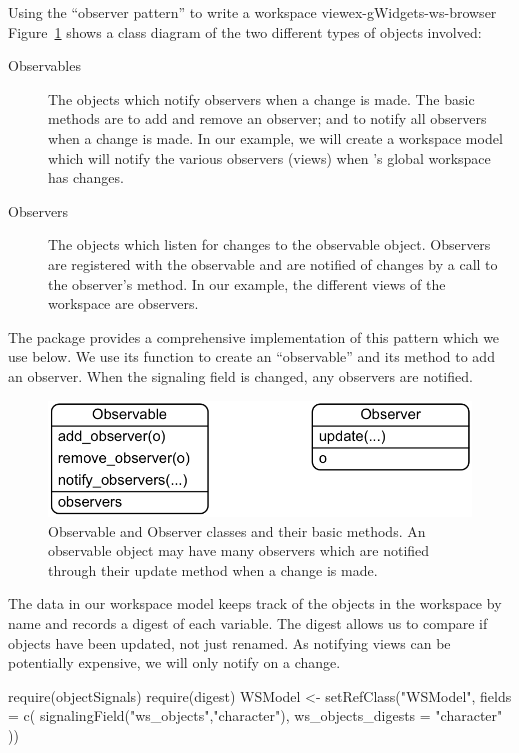 \begin{example}{Using the ``observer pattern'' to write a workspace view}{ex-gWidgets-ws-browser}
Figure~\ref{fig:observer-observable} shows a class diagram of the two
different types of objects involved:


\begin{description}
\item[Observables] The objects which notify observers when a change is
  made. The basic methods are to add and remove an observer; and to
  notify all observers when a change is made. In our example, we will
  create a workspace model which will notify the various observers
  (views) when \R's global workspace has changes.
\item[Observers] The objects which listen for changes to the
  observable object. Observers are registered with the observable and
  are notified of changes by a call to the observer's 
  method. In our example, the different views of the workspace are
  observers.
\end{description}
\vspace{12pt}

The package  provides a comprehensive
implementation of this pattern which we use below. We use its
 function to create an ``observable'' and its
 method to add an observer. When the signaling field
is changed, any observers are notified.
\\

\begin{figure}
  \centering
  \includegraphics[width=.6\textwidth]{fig-gWidgets-observable-observer-uml.png}
 \caption{Observable and Observer classes and their basic methods. An observable object may have many observers which are notified through their update method when a change is made.}
  \label{fig:observer-observable}
\end{figure}



The data in our workspace model keeps track of the objects in the
workspace by name and records a digest of each variable. The digest
allows us to compare if objects have been updated, not just
renamed. As notifying views can be potentially expensive, we will only
notify on a change. 

\begin{Schunk}
\begin{Sinput}
 require(objectSignals)
 require(digest)
 WSModel <- setRefClass("WSModel",
               fields = c(
                 signalingField("ws_objects","character"),
                 ws_objects_digests = "character"
                 ))
\end{Sinput}
\end{Schunk}
%




\end{example}
